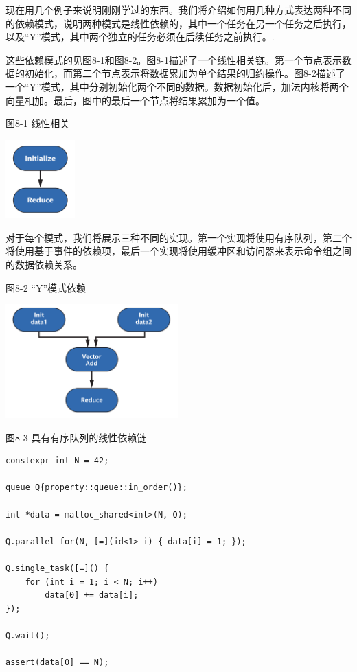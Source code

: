 现在用几个例子来说明刚刚学过的东西。我们将介绍如何用几种方式表达两种不同的依赖模式，说明两种模式是线性依赖的，其中一个任务在另一个任务之后执行，以及“Y”模式，其中两个独立的任务必须在后续任务之前执行。.\par

这些依赖模式的见图8-1和图8-2。图8-1描述了一个线性相关链。第一个节点表示数据的初始化，而第二个节点表示将数据累加为单个结果的归约操作。图8-2描述了一个“Y”模式，其中分别初始化两个不同的数据。数据初始化后，加法内核将两个向量相加。最后，图中的最后一个节点将结果累加为一个值。\par

\hspace*{\fill} \par %
图8-1 线性相关
\begin{center}
	\includegraphics[width=0.2\textwidth]{content/chapter-8/images/2}
\end{center}

对于每个模式，我们将展示三种不同的实现。第一个实现将使用有序队列，第二个将使用基于事件的依赖项，最后一个实现将使用缓冲区和访问器来表示命令组之间的数据依赖关系。\par

\hspace*{\fill} \par %
图8-2 “Y”模式依赖
\begin{center}
	\includegraphics[width=0.5\textwidth]{content/chapter-8/images/3}
\end{center}

\hspace*{\fill} \par %
图8-3 具有有序队列的线性依赖链
\begin{lstlisting}[caption={}]
constexpr int N = 42;

queue Q{property::queue::in_order()};

int *data = malloc_shared<int>(N, Q);

Q.parallel_for(N, [=](id<1> i) { data[i] = 1; });

Q.single_task([=]() {
	for (int i = 1; i < N; i++)
		data[0] += data[i];
});

Q.wait();

assert(data[0] == N);
\end{lstlisting}

